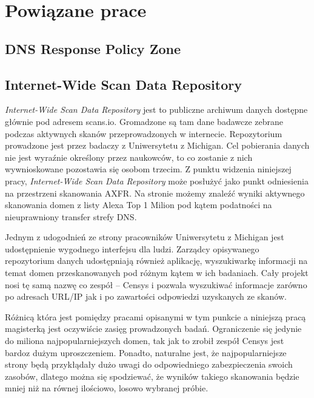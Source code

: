 \chapter{Powiązane prace}

\section{DNS Response Policy Zone}

\section{Internet-Wide Scan Data Repository}
\textit{Internet-Wide Scan Data Repository} jest to publiczne archiwum danych dostępne głównie pod adresem scans.io\cite{scansio}. Gromadzone są tam dane badawcze zebrane podczas aktywnych skanów przeprowadzonych w internecie. Repozytorium prowadzone jest przez badaczy z Uniwersytetu z Michigan\cite{teamcensys}. Cel pobierania danych nie jest wyraźnie określony przez naukowców, to co zostanie z nich wywnioskowane pozostawia się osobom trzecim. Z punktu widzenia niniejszej pracy, \textit{Internet-Wide Scan Data Repository} może posłużyć jako punkt odniesienia na przestrzeni skanowania AXFR. Na stronie możemy znaleźć wyniki aktywnego skanowania domen z listy Alexa Top 1 Milion\cite{alexa} pod kątem podatności na nieuprawniony transfer strefy DNS.

Jednym z udogodnień ze strony pracowników Uniwersytetu z Michigan jest udostępnienie wygodnego interfejsu dla ludzi. Zarządcy opisywanego repozytorium danych udostępniają również aplikację, wyszukiwarkę informacji na temat domen przeskanowanych pod różnym kątem w ich badaniach. Cały projekt nosi tę samą nazwę co zespół -- Censys\cite{censys} i pozwala wyszukiwać informacje zarówno po adresach URL/IP jak i po zawartości odpowiedzi uzyskanych ze skanów.

Różnicą która jest pomiędzy pracami opisanymi w tym punkcie a niniejszą pracą magisterką jest oczywiście zasięg prowadzonych badań. Ograniczenie się jedynie do miliona najpopularniejszych domen, tak jak to zrobił zespół Censys\cite{censys} jest bardoz dużym uproszczeniem. Ponadto, naturalne jest, że najpopularniejsze strony będą przykłądały dużo uwagi do odpowiedniego zabezpieczenia swoich zasobów, dlatego można się spodziewać, że wyników takiego skanowania będzie mniej niż na równej ilościowo, losowo wybranej próbie. 